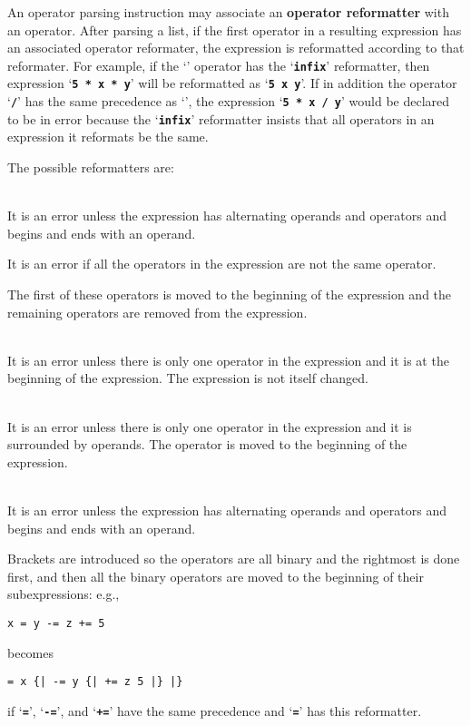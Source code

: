 \documentclass[12pt]{article}
\newcommand{\TT}[1]{{\tt \bfseries #1}}
\newcommand{\key}[1]{{\rm \bfseries #1}}
\newcommand{\ttkey}[1]{{\tt \bfseries #1}}
\newenvironment{indpar}[1][0.3in]%
	{\begin{list}{}%
		     {\setlength{\itemsep}{0in}%
		      \setlength{\topsep}{0in}%
		      \setlength{\parsep}{1ex}%
		      \setlength{\labelwidth}{#1}%
		      \setlength{\leftmargin}{#1}%
		      \addtolength{\leftmargin}{\labelsep}}%
	 \item}%
	{\end{list}}
\begin{document}
An operator parsing instruction may associate an
\key{operator reformatter} with an operator.  After parsing a list,
if the first operator in a resulting expression has an
associated operator reformater, the expression is reformatted
according to that reformater.  For example, if the `\TT{*}' operator
has the `\TT{infix}' reformatter, then expression
`\TT{5 * x * y}' will be reformatted as `\TT{* 5 x y}'.  If in
addition the operator `\TT{/}' has the same precedence
as `\TT{*}', the expression `\TT{5 * x / y}' would be declared to
be in error because the `\TT{infix}' reformatter insists that
all operators in an expression it reformats be the same.

The possible reformatters are:

\begin{indpar}[0.5in]

\hspace*{-0.3in}\ttkey{infix} \\
It is an error unless the expression has alternating operands and operators and
begins and ends with an operand.

It is an error if all the operators in the expression are not
the same operator.

The first of these operators is moved to the
beginning of the expression and the remaining operators are removed
from the expression.

\hspace*{-0.3in}\ttkey{unary} \\
It is an error unless there is only one operator in the expression
and it is at the beginning of the expression.  The expression is
not itself changed.

\hspace*{-0.3in}\ttkey{binary} \\
It is an error unless there is only one operator in the expression
and it is surrounded by operands.  The operator is moved to the
beginning of the expression.

\hspace*{-0.3in}\ttkey{right associative} \\
It is an error unless the expression has alternating operands and operators and
begins and ends with an operand.

Brackets are introduced so the operators are all binary and the
rightmost is done first, and then all the binary operators are moved
to the beginning of their subexpressions:
e.g., 
\begin{center}
\tt x = y -= z += 5
\end{center}
becomes
\begin{center}
\tt = x \{| -= y \{| += z 5 |\} |\}
\end{center}
if `\TT{=}', `\TT{-=}', and `\TT{+=}' have the same precedence and
`\TT{=}' has this reformatter.


\end{indpar}
\end{document}
